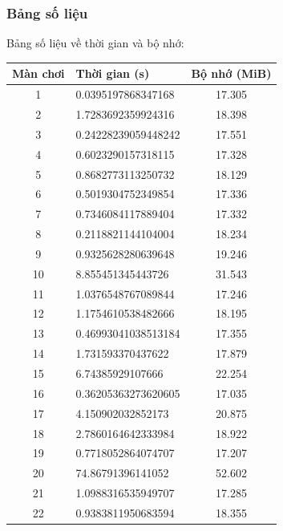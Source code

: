 \documentclass[a4paper, 11pt]{article}
\begin{document}
\subsubsection{Bảng số liệu}
Bảng số liệu về thời gian và bộ nhớ:
\begin{center}
	\begin{tabular}{|c|l|c|}
		\hline
		Màn chơi & Thời gian (s)       & Bộ nhớ (MiB) \\ \hline
		1        & 0.0395197868347168  & 17.305       \\ \hline
		2        & 1.7283692359924316  & 18.398       \\ \hline
		3        & 0.24228239059448242 & 17.551       \\ \hline
		4        & 0.6023290157318115  & 17.328       \\ \hline
		5        & 0.8682773113250732  & 18.129       \\ \hline
		6        & 0.5019304752349854  & 17.336       \\ \hline
		7        & 0.7346084117889404  & 17.332       \\ \hline
		8        & 0.2118821144104004  & 18.234       \\ \hline
		9        & 0.9325628280639648  & 19.246       \\ \hline
		10       & 8.855451345443726   & 31.543       \\ \hline
		11       & 1.0376548767089844  & 17.246       \\ \hline
		12       & 1.1754610538482666  & 18.195       \\ \hline
		13       & 0.46993041038513184 & 17.355       \\ \hline
		14       & 1.731593370437622   & 17.879       \\ \hline
		15       & 6.74385929107666    & 22.254       \\ \hline
		16       & 0.36205363273620605 & 17.035       \\ \hline
		17       & 4.150902032852173   & 20.875       \\ \hline
		18       & 2.7860164642333984  & 18.922       \\ \hline
		19       & 0.7718052864074707  & 17.207       \\ \hline
		20       & 74.86791396141052   & 52.602       \\ \hline
		21       & 1.0988316535949707  & 17.285       \\ \hline
		22       & 0.9383811950683594  & 18.355       \\ \hline

\end{tabular}
\end{center}
\end{document}
